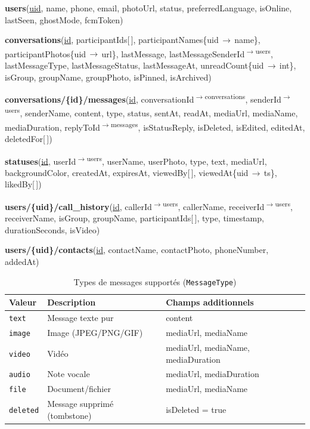 \documentclass[12pt,a4paper]{report}
\begin{document}
\begin{infobox}
\small
\textbf{users}(\underline{uid}, name, phone, email, photoUrl, status,
preferredLanguage, isOnline, lastSeen, ghostMode, fcmToken)

\medskip
\textbf{conversations}(\underline{id},
participantIds[\,], participantNames\{uid\,$\to$\,name\},
participantPhotos\{uid\,$\to$\,url\}, lastMessage,
lastMessageSenderId\textsuperscript{$\to$users},
lastMessageType, lastMessageStatus, lastMessageAt,
unreadCount\{uid\,$\to$\,int\}, isGroup, groupName, groupPhoto,
isPinned, isArchived)

\medskip
\textbf{conversations/\{id\}/messages}(\underline{id},
conversationId\textsuperscript{$\to$conversations},
senderId\textsuperscript{$\to$users}, senderName, content, type,
status, sentAt, readAt, mediaUrl, mediaName, mediaDuration,
replyToId\textsuperscript{$\to$messages}, isStatusReply, isDeleted,
isEdited, editedAt, deletedFor[\,])

\medskip
\textbf{statuses}(\underline{id},
userId\textsuperscript{$\to$users}, userName, userPhoto, type,
text, mediaUrl, backgroundColor, createdAt, expiresAt,
viewedBy[\,], viewedAt\{uid\,$\to$\,ts\}, likedBy[\,])

\medskip
\textbf{users/\{uid\}/call\_history}(\underline{id},
callerId\textsuperscript{$\to$users}, callerName,
receiverId\textsuperscript{$\to$users}, receiverName, isGroup,
groupName, participantIds[\,], type, timestamp, durationSeconds, isVideo)

\medskip
\textbf{users/\{uid\}/contacts}(\underline{id},
contactName, contactPhoto, phoneNumber, addedAt)
\end{infobox}

\begin{table}[H]
\centering
\caption{Types de messages supportés (\texttt{MessageType})}
\label{tab:msgtypes}
\renewcommand{\arraystretch}{1.3}
\begin{tabular}{@{}lll@{}}
\toprule
\textbf{Valeur} & \textbf{Description} & \textbf{Champs additionnels}\\\midrule
\texttt{text}    & Message texte pur           & content \\
\texttt{image}   & Image (JPEG/PNG/GIF)        & mediaUrl, mediaName \\
\texttt{video}   & Vidéo                       & mediaUrl, mediaName, mediaDuration \\
\texttt{audio}   & Note vocale                 & mediaUrl, mediaDuration \\
\texttt{file}    & Document/fichier            & mediaUrl, mediaName \\
\texttt{deleted} & Message supprimé (tombstone) & isDeleted = true \\
\bottomrule
\end{tabular}
\end{table}
\end{document}
